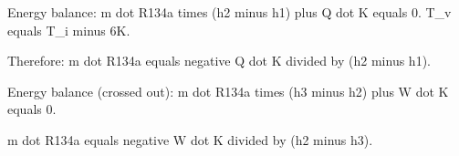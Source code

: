 Energy balance:  
m dot R134a times (h2 minus h1) plus Q dot K equals 0.  
T_v equals T_i minus 6K.  

Therefore:  
m dot R134a equals negative Q dot K divided by (h2 minus h1).  

Energy balance (crossed out):  
m dot R134a times (h3 minus h2) plus W dot K equals 0.  

m dot R134a equals negative W dot K divided by (h2 minus h3).